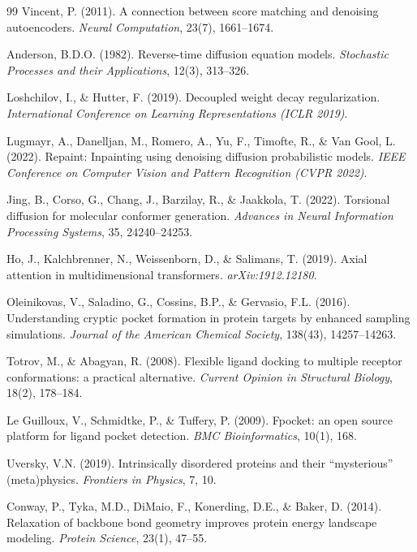 \documentclass[11pt,a4paper]{article}
\begin{document}
\begin{thebibliography}{99}
Vincent, P. (2011).
A connection between score matching and denoising autoencoders.
\textit{Neural Computation}, 23(7), 1661--1674.

Anderson, B.D.O. (1982).
Reverse-time diffusion equation models.
\textit{Stochastic Processes and their Applications}, 12(3), 313--326.

Loshchilov, I., \& Hutter, F. (2019).
Decoupled weight decay regularization.
\textit{International Conference on Learning Representations (ICLR 2019)}.

Lugmayr, A., Danelljan, M., Romero, A., Yu, F., Timofte, R., \& Van Gool, L. (2022).
Repaint: Inpainting using denoising diffusion probabilistic models.
\textit{IEEE Conference on Computer Vision and Pattern Recognition (CVPR 2022)}.

Jing, B., Corso, G., Chang, J., Barzilay, R., \& Jaakkola, T. (2022).
Torsional diffusion for molecular conformer generation.
\textit{Advances in Neural Information Processing Systems}, 35, 24240--24253.

Ho, J., Kalchbrenner, N., Weissenborn, D., \& Salimans, T. (2019).
Axial attention in multidimensional transformers.
\textit{arXiv:1912.12180}.

Oleinikovas, V., Saladino, G., Cossins, B.P., \& Gervasio, F.L. (2016).
Understanding cryptic pocket formation in protein targets by enhanced sampling simulations.
\textit{Journal of the American Chemical Society}, 138(43), 14257--14263.

Totrov, M., \& Abagyan, R. (2008).
Flexible ligand docking to multiple receptor conformations: a practical alternative.
\textit{Current Opinion in Structural Biology}, 18(2), 178--184.

Le Guilloux, V., Schmidtke, P., \& Tuffery, P. (2009).
Fpocket: an open source platform for ligand pocket detection.
\textit{BMC Bioinformatics}, 10(1), 168.

Uversky, V.N. (2019).
Intrinsically disordered proteins and their ``mysterious'' (meta)physics.
\textit{Frontiers in Physics}, 7, 10.

Conway, P., Tyka, M.D., DiMaio, F., Konerding, D.E., \& Baker, D. (2014).
Relaxation of backbone bond geometry improves protein energy landscape modeling.
\textit{Protein Science}, 23(1), 47--55.


\end{thebibliography}
\end{document}
